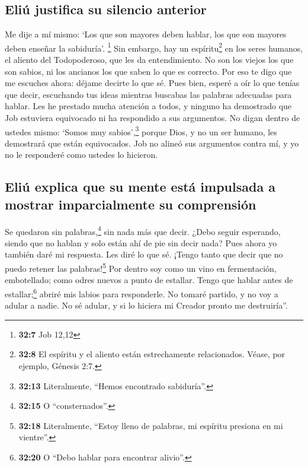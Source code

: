 \hypertarget{eliuxfa-justifica-su-silencio-anterior}{%
\subsection{Eliú justifica su silencio
anterior}\label{eliuxfa-justifica-su-silencio-anterior}}

 Me dije a mí mismo: `Los que son mayores deben hablar,
los que son mayores deben enseñar la sabiduría'. \footnote{\textbf{32:7}
  Job 12,12}  Sin embargo, hay un espíritu\footnote{\textbf{32:8}
  El espíritu y el aliento están estrechamente relacionados. Véase, por
  ejemplo, Génesis 2:7.} en los seres humanos, el aliento del
Todopoderoso, que les da entendimiento.  No son los viejos
los que son sabios, ni los ancianos los que saben lo que es correcto.
 Por eso te digo que me escuches ahora: déjame decirte lo
que sé.  Pues bien, esperé a oír lo que tenías que decir,
escuchando tus ideas mientras buscabas las palabras adecuadas para
hablar.  Les he prestado mucha atención a todos, y
ninguno ha demostrado que Job estuviera equivocado ni ha respondido a
sus argumentos.  No digan dentro de ustedes mismo: `Somos
muy sabios',\footnote{\textbf{32:13} Literalmente, ``Hemos encontrado
  sabiduría''.} porque Dios, y no un ser humano, les demostrará que
están equivocados.  Job no alineó sus argumentos contra
mí, y yo no le responderé como ustedes lo hicieron.

\hypertarget{eliuxfa-explica-que-su-mente-estuxe1-impulsada-a-mostrar-imparcialmente-su-comprensiuxf3n}{%
\subsection{Eliú explica que su mente está impulsada a mostrar
imparcialmente su
comprensión}\label{eliuxfa-explica-que-su-mente-estuxe1-impulsada-a-mostrar-imparcialmente-su-comprensiuxf3n}}

 Se quedaron sin palabras,\footnote{\textbf{32:15} O
  ``consternados''.} sin nada más que decir.  ¿Debo
seguir esperando, siendo que no hablan y solo están ahí de pie sin decir
nada?  Pues ahora yo también daré mi respuesta. Les diré
lo que sé.  ¡Tengo tanto que decir que no puedo retener
las palabras!\footnote{\textbf{32:18} Literalmente, ``Estoy lleno de
  palabras, mi espíritu presiona en mi vientre''.}  Por
dentro soy como un vino en fermentación, embotellado; como odres nuevos
a punto de estallar.  Tengo que hablar antes de
estallar;\footnote{\textbf{32:20} O ``Debo hablar para encontrar
  alivio''.} abriré mis labios para responderle.  No
tomaré partido, y no voy a adular a nadie.  No sé adular,
y si lo hiciera mi Creador pronto me destruiría''.

